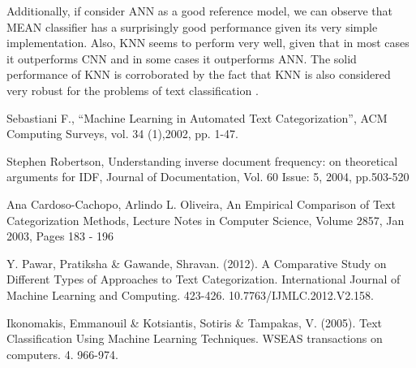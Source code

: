 \documentclass[10pt,journal,compsoc]{IEEEtran}
\begin{document}
Additionally, if consider ANN as a good reference model,
we can observe that MEAN classifier has a surprisingly 
good performance given its very simple implementation.
Also, KNN seems to perform very well, given that in most
cases it outperforms CNN and in some cases it outperforms
ANN.
The solid performance of KNN is corroborated by the fact
that KNN is also considered very robust for the problems
of text classification \cite{a3}.

\begin{thebibliography}{1}
	
	 Sebastiani F., “Machine Learning in
	Automated Text Categorization”, ACM
	Computing Surveys, vol. 34 (1),2002, pp. 1-47.
	
	Stephen Robertson, 
	Understanding inverse document frequency: 
	on theoretical arguments for IDF, Journal 
	of Documentation, Vol. 60 Issue: 5, 
	2004, pp.503-520
	
	Ana Cardoso-Cachopo, Arlindo L. Oliveira, An
	Empirical Comparison of Text Categorization
	Methods, Lecture Notes in Computer Science,
	Volume 2857, Jan 2003, Pages 183 - 196
	
	Y. Pawar, Pratiksha \& Gawande, Shravan. (2012). 
	A Comparative Study on Different Types of Approaches 
	to Text Categorization. 
	International Journal of Machine Learning and Computing. 
	423-426. 10.7763/IJMLC.2012.V2.158.
	
	Ikonomakis, Emmanouil \& Kotsiantis, Sotiris \& 
	Tampakas, V. (2005). Text Classification Using Machine Learning 
	Techniques. WSEAS transactions on computers. 4. 966-974. 
\end{thebibliography}


%
\end{document}
